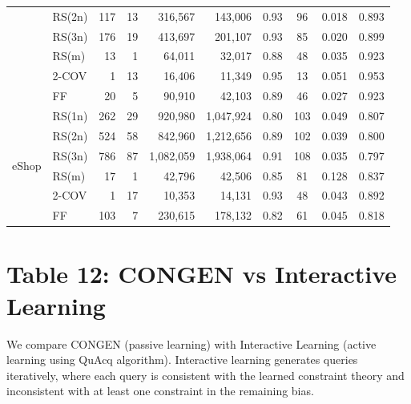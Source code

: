 \documentclass[11pt]{article}
\begin{document}
\begin{table}[htbp]
{\begin{tabular}{ll|rrrr|cc|cc}
    & RS(2n)  & 117 & 13 & 316,567   & 143,006   & 0.93 & 96  & 0.018 & 0.893 \\
    & RS(3n)  & 176 & 19 & 413,697   & 201,107   & 0.93 & 85  & 0.020 & 0.899 \\
    & RS(m)   & 13  & 1  & 64,011    & 32,017    & 0.88 & 48  & 0.035 & 0.923 \\
    & 2-COV   & 1   & 13 & 16,406    & 11,349    & 0.95 & 13  & 0.051 & 0.953 \\
    & FF      & 20  & 5  & 90,910    & 42,103    & 0.89 & 46  & 0.027 & 0.923 \\
\midrule
\multirow{6}{*}{eShop}
    & RS(1n)  & 262 & 29 & 920,980   & 1,047,924 & 0.80 & 103 & 0.049 & 0.807 \\
    & RS(2n)  & 524 & 58 & 842,960   & 1,212,656 & 0.89 & 102 & 0.039 & 0.800 \\
    & RS(3n)  & 786 & 87 & 1,082,059 & 1,938,064 & 0.91 & 108 & 0.035 & 0.797 \\
    & RS(m)   & 17  & 1  & 42,796    & 42,506    & 0.85 & 81  & 0.128 & 0.837 \\
    & 2-COV   & 1   & 17 & 10,353    & 14,131    & 0.93 & 48  & 0.043 & 0.892 \\
    & FF      & 103 & 7  & 230,615   & 178,132   & 0.82 & 61  & 0.045 & 0.818 \\
\bottomrule
\end{tabular}%
}
\end{table}

\section{Table 12: CONGEN vs Interactive Learning}

We compare CONGEN (passive learning) with Interactive Learning (active learning using QuAcq algorithm).
Interactive learning generates queries iteratively, where each query is consistent with the learned constraint theory
and inconsistent with at least one constraint in the remaining bias.
\end{document}
